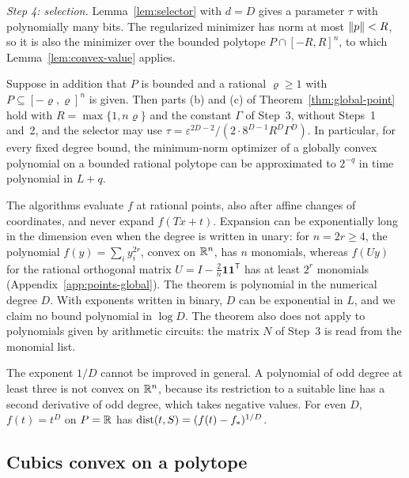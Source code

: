 \emph{Step 4: selection.} Lemma~\ref{lem:selector} with $d=D$ gives a
parameter $\tau$ with polynomially many bits. The regularized minimizer has
norm at most $\left\lVert p\right\rVert<R$, so it is also the minimizer over the bounded
polytope $P\cap[-R,R]^n$, to which Lemma~\ref{lem:convex-value} applies.

\begin{corollary}\label{cor:points-bounded}
Suppose in addition that $P$ is bounded and a rational $\varrho\ge1$ with
$P\subseteq[-\varrho,\varrho]^n$ is given. Then parts (b) and (c) of
Theorem~\ref{thm:global-point} hold with $R=\max\{1,n\varrho\}$ and the
constant $\Gamma$ of Step~3, without Steps~1 and~2, and the selector may use
$\tau=\varepsilon^{2D-2}/(2\cdot8^{D-1}R^D\Gamma^D)$. In particular, for
every fixed degree bound, the minimum-norm optimizer of a globally convex
polynomial on a bounded rational polytope can be approximated to $2^{-q}$ in
time polynomial in $L+q$.
\end{corollary}

\begin{remark}\label{rem:points-expansion}
The algorithms evaluate $f$ at rational points, also after affine changes
of coordinates, and never expand $f(Tx+t)$. Expansion can be exponentially
long in the dimension even when the degree is written in unary: for
$n=2r\ge4$, the polynomial
$f(y)=\sum_iy_i^{2r}$, convex on $\mathbb R^n$, has $n$ monomials, whereas
$f(Uy)$ for the rational orthogonal matrix
$U=I-\frac2n\mathbf1\mathbf1^{\mathsf T}$ has at least $2^r$ monomials
(Appendix~\ref{app:points-global}). The theorem is polynomial in the
numerical degree $D$. With exponents written in binary, $D$ can be
exponential in $L$, and we claim no bound polynomial in $\log D$. The
theorem also does not apply to polynomials given by arithmetic circuits: the
matrix $N$ of Step~3 is read from the monomial list.
\end{remark}

The exponent $1/D$ cannot be improved in general. A polynomial of odd
degree at least three is not convex on $\mathbb R^n$, because its restriction to a
suitable line has a second derivative of odd degree, which takes negative
values. For even $D$,
$f(t)=t^D$ on $P=\mathbb R$ has $\operatorname{dist}(t,S)=(f(t)-f_*)^{1/D}$.

\subsection{Cubics convex on a polytope}\label{sec:points-cubic}

